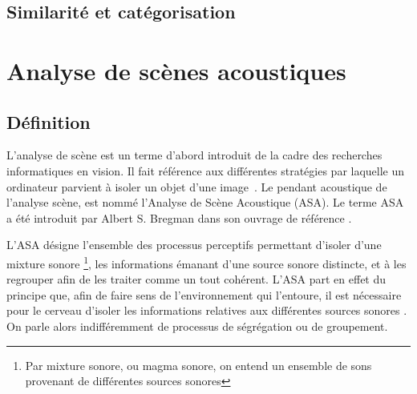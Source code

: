 \subsection{Similarité et catégorisation}

\section{Analyse de scènes acoustiques}
\label{sec:ASA}

\subsection{Définition}
\label{sec:ASAintro}
L'analyse de scène est un terme d'abord introduit de la cadre des recherches informatiques en vision. Il fait référence aux différentes stratégies par laquelle un ordinateur parvient à isoler un objet d'une image~\citep[p. 12]{mcadams1994penser}. Le pendant acoustique de l'analyse scène, est nommé l'Analyse de Scène Acoustique (ASA). Le terme ASA a été introduit par Albert S. Bregman dans son ouvrage de référence \citep{bregman1994auditory}.  

L'ASA désigne l'ensemble des processus perceptifs permettant d'isoler d'une mixture sonore \footnote{Par mixture sonore, ou magma sonore, on entend un ensemble de sons provenant de différentes sources sonores}, les informations émanant d'une source sonore distincte, et à les regrouper afin de les traiter comme un tout cohérent. L'ASA part en effet du principe que, afin de faire sens de l'environnement qui l'entoure, il est nécessaire pour le cerveau d'isoler les informations relatives aux différentes sources sonores \citep{winkler2009modeling}. On parle alors indifféremment de processus de ségrégation ou de groupement.

